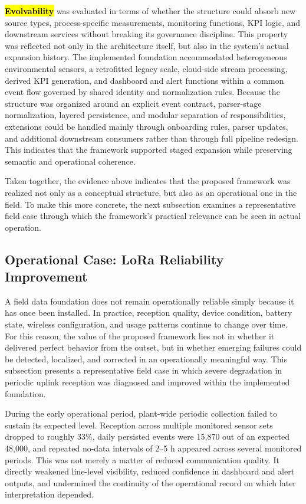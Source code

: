 \documentclass[systems,article,accept,pdftex,moreauthors]{Definitions/mdpi}
\begin{document}
\textbf{\hl{Evolvability}} was evaluated in terms of whether the structure could absorb new source types, process-specific measurements, monitoring functions, KPI logic, and downstream services without breaking its governance discipline. This property was reflected not only in the architecture itself, but also in the system's actual expansion history. The implemented foundation accommodated heterogeneous environmental sensors, a retrofitted legacy scale, cloud-side stream processing, derived KPI generation, and dashboard and alert functions within a common event flow governed by shared identity and normalization rules. Because the structure was organized around an explicit event contract, parser-stage normalization, layered persistence, and modular separation of responsibilities, extensions could be handled mainly through onboarding rules, parser updates, and additional downstream consumers rather than through full pipeline redesign. This indicates that the framework supported staged expansion while preserving semantic and operational coherence.

Taken together, the evidence above indicates that the proposed framework was realized not only as a conceptual structure, but also as an operational one in the field. To make this more concrete, the next subsection examines a representative field case through which the framework's practical relevance can be seen in actual operation.



\subsection{Operational Case: LoRa Reliability Improvement}
\label{sec:lora_reliability}



A field data foundation does not remain operationally reliable simply because it has once been installed. In practice, reception quality, device condition, battery state, wireless configuration, and usage patterns continue to change over time. For this reason, the value of the proposed framework lies not in whether it delivered perfect behavior from the outset, but in whether emerging failures could be detected, localized, and corrected in an operationally meaningful way. This subsection presents a representative field case in which severe degradation in periodic uplink reception was diagnosed and improved within the implemented foundation.

During the early operational period, plant-wide periodic collection failed to sustain its expected level. Reception across multiple monitored sensor sets dropped to roughly 33\%, daily persisted events were 15{,}870 out of an expected 48{,}000, and repeated no-data intervals of 2--5 h appeared across several monitored periods. This was not merely a matter of reduced communication quality. It directly weakened line-level visibility, reduced confidence in dashboard and alert outputs, and undermined the continuity of the operational record on which later interpretation depended.
\end{document}
